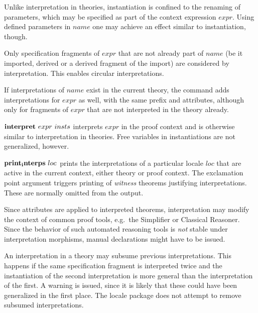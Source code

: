 \begin{descr}
  Unlike interpretation in theories, instantiation is confined to the
  renaming of parameters, which may be specified as part of the context
  expression $expr$.  Using defined parameters in $name$ one may
  achieve an effect similar to instantiation, though.

  Only specification fragments of $expr$ that are not already part of
  $name$ (be it imported, derived or a derived fragment of the import)
  are considered by interpretation.  This enables circular
  interpretations.

  If interpretations of $name$ exist in the current theory, the
  command adds interpretations for $expr$ as well, with the same
  prefix and attributes, although only for fragments of $expr$ that
  are not interpreted in the theory already.

\item [${\mathord{\mathbf{interpret}}}~expr~insts$]
  interprets $expr$ in the proof context and is otherwise similar to
  interpretation in theories.  Free variables in instantiations are not
  generalized, however.

\item [${\mathord{\mathbf{print_interps}}}~loc$]
  prints the interpretations of a particular locale $loc$ that are
  active in the current context, either theory or proof context.  The
  exclamation point argument triggers printing of
  \emph{witness} theorems justifying interpretations.  These are
  normally omitted from the output.

  
\end{descr}

\begin{warn}
  Since attributes are applied to interpreted theorems, interpretation
  may modify the context of common proof tools, e.g.\ the Simplifier
  or Classical Reasoner.  Since the behavior of such automated
  reasoning tools is \emph{not} stable under interpretation morphisms,
  manual declarations might have to be issued.
\end{warn}

\begin{warn}
  An interpretation in a theory may subsume previous interpretations.
  This happens if the same specification fragment is interpreted twice
  and the instantiation of the second interpretation is more general
  than the interpretation of the first.  A warning is issued, since it
  is likely that these could have been generalized in the first place.
  The locale package does not attempt to remove subsumed
  interpretations.
\end{warn}


